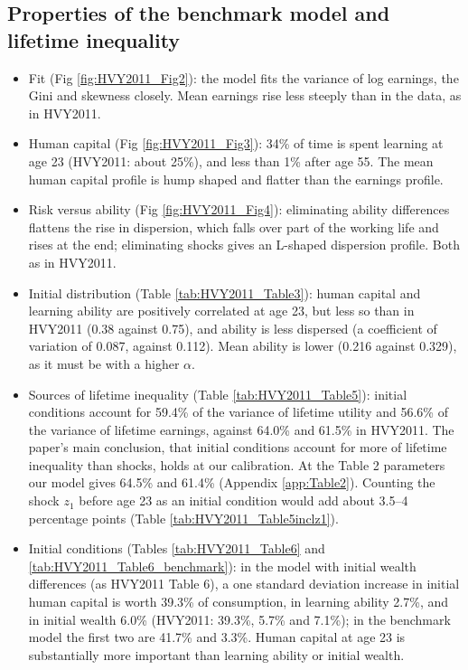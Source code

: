 \documentclass[11pt,fleqn]{article}
\begin{document}
\subsection{Properties of the benchmark model and lifetime inequality}

\begin{itemize}
 \item Fit (Fig \ref{fig:HVY2011_Fig2}): the model fits the variance of log earnings, the Gini and skewness closely. Mean earnings rise less steeply than in the data, as in HVY2011.
 \item Human capital (Fig \ref{fig:HVY2011_Fig3}): 34\% of time is spent learning at age 23 (HVY2011: about 25\%), and less than 1\% after age 55. The mean human capital profile is hump shaped and flatter than the earnings profile.
 \item Risk versus ability (Fig \ref{fig:HVY2011_Fig4}): eliminating ability differences flattens the rise in dispersion, which falls over part of the working life and rises at the end; eliminating shocks gives an L-shaped dispersion profile. Both as in HVY2011.
 \item Initial distribution (Table \ref{tab:HVY2011_Table3}): human capital and learning ability are positively correlated at age 23, but less so than in HVY2011 (0.38 against 0.75), and ability is less dispersed (a coefficient of variation of 0.087, against 0.112). Mean ability is lower (0.216 against 0.329), as it must be with a higher $\alpha$.
 \item Sources of lifetime inequality (Table \ref{tab:HVY2011_Table5}): initial conditions account for 59.4\% of the variance of lifetime utility and 56.6\% of the variance of lifetime earnings, against 64.0\% and 61.5\% in HVY2011. The paper's main conclusion, that initial conditions account for more of lifetime inequality than shocks, holds at our calibration. At the Table 2 parameters our model gives 64.5\% and 61.4\% (Appendix \ref{app:Table2}). Counting the shock $z_1$ before age 23 as an initial condition would add about 3.5--4 percentage points (Table \ref{tab:HVY2011_Table5inclz1}).
 \item Initial conditions (Tables \ref{tab:HVY2011_Table6} and \ref{tab:HVY2011_Table6_benchmark}): in the model with initial wealth differences (as HVY2011 Table 6), a one standard deviation increase in initial human capital is worth 39.3\% of consumption, in learning ability 2.7\%, and in initial wealth 6.0\% (HVY2011: 39.3\%, 5.7\% and 7.1\%); in the benchmark model the first two are 41.7\% and 3.3\%. Human capital at age 23 is substantially more important than learning ability or initial wealth.

\end{itemize}
\end{document}
